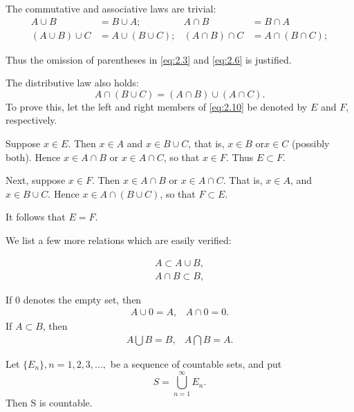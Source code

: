 The commutative and associative laws are trivial:
\begin{align}
        A \cup B &= B \cup A; &
        A \cap B &= B \cap A \label{eq:2.8} \\
        \left(A \cup B\right) \cup C &= A \cup \left(B \cup C\right); &
        \left(A \cap B\right) \cap C &= A \cap \left(B \cap C\right);\label{eq:2.9}
\end{align}

Thus the omission of parentheses in \ref{eq:2.3} and \ref{eq:2.6} is justified.

The distributive law also holds:
\begin{equation}\label{eq:2.10}
    A \cap \left( B \cup C\right) = 
    \left(A \cap B\right) \cup \left(A \cap C\right).
\end{equation}
To prove this, let the left and right members of \ref{eq:2.10} be denoted by $E$ and $F$, respectively.

Suppose $x \in E$. Then $x \in A$ and $x \in B \cup C$, that is, $x \in B$ or$ x \in C$ (possibly both). Hence $x \in A\cap B$ or $x \in A\cap C$, so that $x \in F$. Thus $E \subset F$.

Next, suppose $x \in F$. Then $x \in A\cap B$ or $x \in A\cap C$. That is, $x \in A$, and $x \in B\cup C$. Hence $x \in A\cap \left(B \cup C\right)$, so that $F \subset E$.

It follows that $E = F$.

We list a few more relations which are easily verified:

\begin{align}
    A \subset A \cup B, \label{eq:2.11}\\
    A \cap B \subset B, \label{eq:2.12}
\end{align}

If $0$ denotes the empty set, then
\begin{equation}
    \begin{array}{cc}
        A \cup 0 = A, & A \cap 0 = 0.
    \end{array}
\end{equation}
If $A \subset B$, then
\begin{equation}
    \begin{array}{cc}
        A \bigcup B = B, & A \bigcap B = A.
    \end{array}
\end{equation}



\begin{thm}
    \label{thm:2.12}
    Let $\{E_n\}, n=1,2,3,...,$ be a sequence of countable sets, and put
    \begin{equation}
        \label{eq:2.15}
        S = \bigcup_{n=1}^{\infty} E_n.
    \end{equation}
    Then S is countable.
\end{thm}

